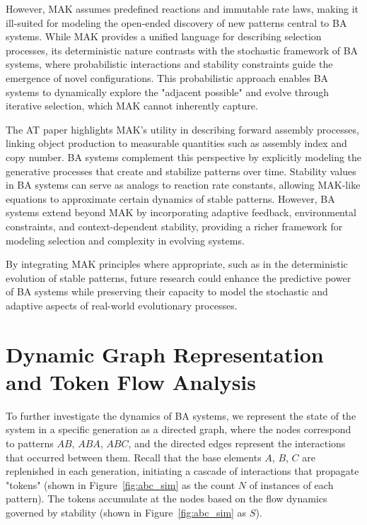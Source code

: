 \documentclass[entropy,article,submit,pdftex,oneauthor]{Definitions/mdpi}
\begin{document}
However, MAK assumes predefined reactions and immutable rate laws, making it ill-suited for modeling the open-ended discovery of new patterns central to BA systems. While MAK provides a unified language for describing selection processes, its deterministic nature contrasts with the stochastic framework of BA systems, where probabilistic interactions and stability constraints guide the emergence of novel configurations. This probabilistic approach enables BA systems to dynamically explore the "adjacent possible" \cite{kauffman1996investigations} and evolve through iterative selection, which MAK cannot inherently capture.

The AT paper \cite{walker2023nature} highlights MAK’s utility in describing forward assembly processes, linking object production to measurable quantities such as assembly index and copy number. BA systems complement this perspective by explicitly modeling the generative processes that create and stabilize patterns over time. Stability values in BA systems can serve as analogs to reaction rate constants, allowing MAK-like equations to approximate certain dynamics of stable patterns. However, BA systems extend beyond MAK by incorporating adaptive feedback, environmental constraints, and context-dependent stability, providing a richer framework for modeling selection and complexity in evolving systems.

By integrating MAK principles where appropriate, such as in the deterministic evolution of stable patterns, future research could enhance the predictive power of BA systems while preserving their capacity to model the stochastic and adaptive aspects of real-world evolutionary processes.

\section{Dynamic Graph Representation and Token Flow Analysis}

To further investigate the dynamics of BA systems, we represent the state of the system in a specific generation as a directed graph, where the nodes correspond to patterns $AB$, $ABA$, $ABC$, and the directed edges represent the interactions that occurred between them. Recall that the base elements $A$, $B$, $C$ are replenished in each generation, initiating a cascade of interactions that propagate "tokens" (shown in Figure~\ref{fig:abc_sim} as the count $N$ of instances of each pattern). The tokens accumulate at the nodes based on the flow dynamics governed by stability (shown in Figure~\ref{fig:abc_sim} as $S$).
\end{document}
